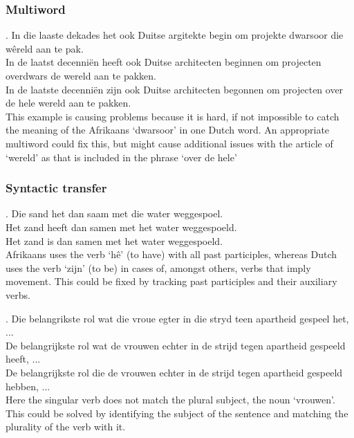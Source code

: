 \documentclass[11pt]{article}
\begin{document}
\subsubsection{Multiword}

\ex. \label{ex:exmw} 
    In die laaste dekades het ook Duitse argitekte begin om projekte dwarsoor die wêreld aan te pak. \\
    In de laatst decenniën heeft ook Duitse architecten beginnen om projecten overdwars de wereld aan te pakken. \\
    In de laatste decenniën zijn ook Duitse architecten begonnen om projecten over de hele wereld aan te pakken. \\

This example is causing problems because it is hard, if not impossible to catch the meaning of the Afrikaans `dwarsoor' in one Dutch word.
 An appropriate multiword could fix this, but might cause additional issues with the article of `wereld' as that is included in the phrase `over de hele'

\subsubsection{Syntactic transfer}

\ex. \label{ex:exsgpl} 
    Die sand het dan saam met die water weggespoel. \\
    Het zand heeft dan samen met het water weggespoeld. \\
    Het zand is dan samen met het water weggespoeld. \\

Afrikaans uses the verb `hê' (to have) with all past participles, whereas Dutch uses the verb `zijn' (to be) in cases of, 
amongst others, verbs that imply movement. This could be fixed by tracking past participles and their auxiliary verbs.


\ex. \label{ex:exsgpl} 
    Die belangrikste rol wat die vroue egter in die stryd teen apartheid gespeel het, ... \\
    De belangrijkste rol wat de vrouwen echter in de strijd tegen apartheid gespeeld heeft, ... \\
    De belangrijkste rol die de vrouwen echter in de strijd tegen apartheid gespeeld hebben, ... \\

Here the singular verb does not match the plural subject, the noun `vrouwen'.
 This could be solved by identifying the subject of the sentence and matching the plurality of the verb with it.
\end{document}
